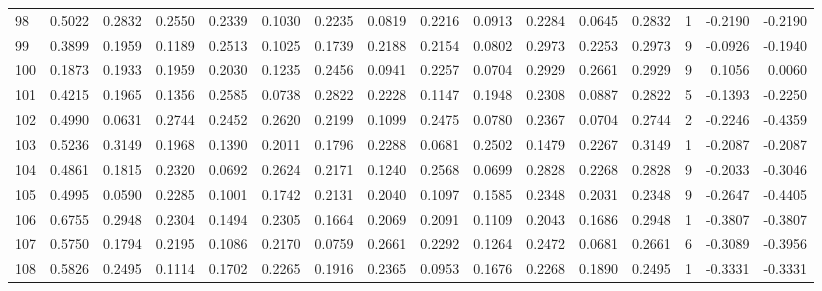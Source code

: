 \begin{tabular}{lrrrrrrrrrrrrrrr}
98  &      0.5022 &  0.2832 &  0.2550 &  0.2339 &  0.1030 &  0.2235 &  0.0819 &  0.2216 &  0.0913 &  0.2284 &   0.0645 &     0.2832 &      1 &                   -0.2190 &                    -0.2190 \\
99  &      0.3899 &  0.1959 &  0.1189 &  0.2513 &  0.1025 &  0.1739 &  0.2188 &  0.2154 &  0.0802 &  0.2973 &   0.2253 &     0.2973 &      9 &                   -0.0926 &                    -0.1940 \\
100 &      0.1873 &  0.1933 &  0.1959 &  0.2030 &  0.1235 &  0.2456 &  0.0941 &  0.2257 &  0.0704 &  0.2929 &   0.2661 &     0.2929 &      9 &                    0.1056 &                     0.0060 \\
101 &      0.4215 &  0.1965 &  0.1356 &  0.2585 &  0.0738 &  0.2822 &  0.2228 &  0.1147 &  0.1948 &  0.2308 &   0.0887 &     0.2822 &      5 &                   -0.1393 &                    -0.2250 \\
102 &      0.4990 &  0.0631 &  0.2744 &  0.2452 &  0.2620 &  0.2199 &  0.1099 &  0.2475 &  0.0780 &  0.2367 &   0.0704 &     0.2744 &      2 &                   -0.2246 &                    -0.4359 \\
103 &      0.5236 &  0.3149 &  0.1968 &  0.1390 &  0.2011 &  0.1796 &  0.2288 &  0.0681 &  0.2502 &  0.1479 &   0.2267 &     0.3149 &      1 &                   -0.2087 &                    -0.2087 \\
104 &      0.4861 &  0.1815 &  0.2320 &  0.0692 &  0.2624 &  0.2171 &  0.1240 &  0.2568 &  0.0699 &  0.2828 &   0.2268 &     0.2828 &      9 &                   -0.2033 &                    -0.3046 \\
105 &      0.4995 &  0.0590 &  0.2285 &  0.1001 &  0.1742 &  0.2131 &  0.2040 &  0.1097 &  0.1585 &  0.2348 &   0.2031 &     0.2348 &      9 &                   -0.2647 &                    -0.4405 \\
106 &      0.6755 &  0.2948 &  0.2304 &  0.1494 &  0.2305 &  0.1664 &  0.2069 &  0.2091 &  0.1109 &  0.2043 &   0.1686 &     0.2948 &      1 &                   -0.3807 &                    -0.3807 \\
107 &      0.5750 &  0.1794 &  0.2195 &  0.1086 &  0.2170 &  0.0759 &  0.2661 &  0.2292 &  0.1264 &  0.2472 &   0.0681 &     0.2661 &      6 &                   -0.3089 &                    -0.3956 \\
108 &      0.5826 &  0.2495 &  0.1114 &  0.1702 &  0.2265 &  0.1916 &  0.2365 &  0.0953 &  0.1676 &  0.2268 &   0.1890 &     0.2495 &      1 &                   -0.3331 &                    -0.3331 \\

\end{tabular}
